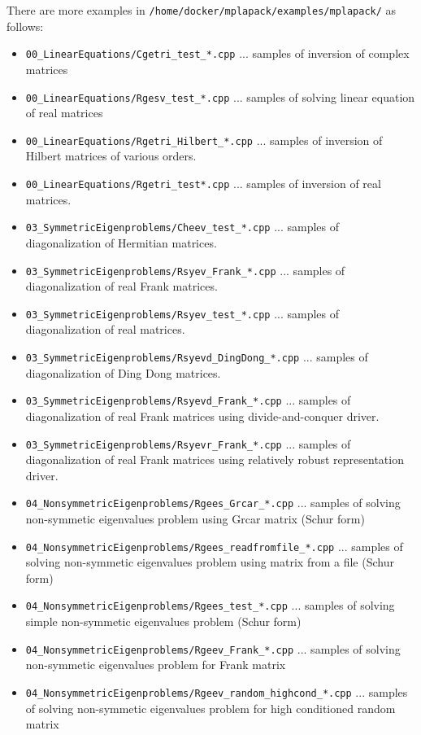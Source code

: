 \documentclass[12pt]{article}
\begin{document}
There are more examples in {\tt /home/docker/mplapack/examples/mplapack/} as follows:
\begin{itemize}
\item {\tt 00\_LinearEquations/Cgetri\_test\_*.cpp} ... samples of inversion of complex matrices
\item {\tt 00\_LinearEquations/Rgesv\_test\_*.cpp} ... samples of solving linear equation of real matrices
\item {\tt 00\_LinearEquations/Rgetri\_Hilbert\_*.cpp} ... samples of inversion of Hilbert matrices of various orders.
\item {\tt 00\_LinearEquations/Rgetri\_test*.cpp} ... samples of inversion of real matrices.
\item {\tt 03\_SymmetricEigenproblems/Cheev\_test\_*.cpp} ... samples of diagonalization of Hermitian matrices.
\item {\tt 03\_SymmetricEigenproblems/Rsyev\_Frank\_*.cpp} ... samples of diagonalization of real Frank matrices.
\item {\tt 03\_SymmetricEigenproblems/Rsyev\_test\_*.cpp} ... samples of diagonalization of real matrices.
\item {\tt 03\_SymmetricEigenproblems/Rsyevd\_DingDong\_*.cpp} ... samples of diagonalization of Ding Dong matrices.
\item {\tt 03\_SymmetricEigenproblems/Rsyevd\_Frank\_*.cpp} ... samples of diagonalization of real Frank matrices using divide-and-conquer driver.
\item {\tt 03\_SymmetricEigenproblems/Rsyevr\_Frank\_*.cpp}  ... samples of diagonalization of real Frank matrices using relatively robust representation driver.
\item {\tt 04\_NonsymmetricEigenproblems/Rgees\_Grcar\_*.cpp} ... samples of solving non-symmetic eigenvalues problem using Grcar matrix (Schur form)
\item {\tt 04\_NonsymmetricEigenproblems/Rgees\_readfromfile\_*.cpp} ... samples of solving non-symmetic eigenvalues problem using matrix from a file (Schur form)
\item {\tt 04\_NonsymmetricEigenproblems/Rgees\_test\_*.cpp} ... samples of solving simple non-symmetic eigenvalues problem (Schur form)
\item {\tt 04\_NonsymmetricEigenproblems/Rgeev\_Frank\_*.cpp} ... samples of solving non-symmetic eigenvalues problem for Frank matrix
\item {\tt 04\_NonsymmetricEigenproblems/Rgeev\_random\_highcond\_*.cpp}  ... samples of solving non-symmetic eigenvalues problem for high conditioned random matrix

\end{itemize}
\end{document}
